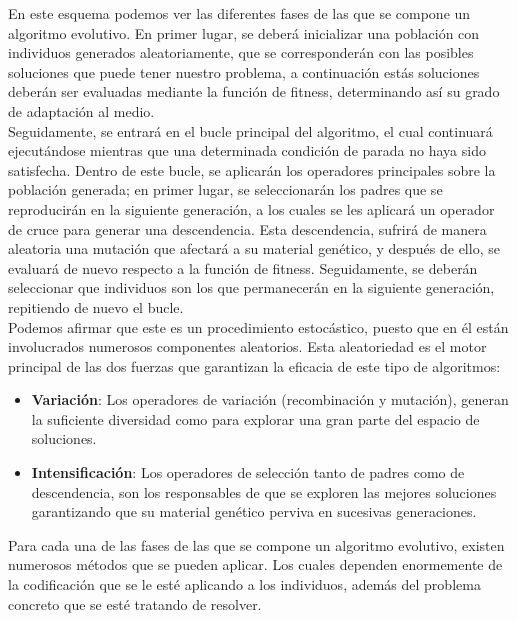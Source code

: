 En este esquema podemos ver las diferentes fases de las que se compone un algoritmo evolutivo. En primer lugar, se deberá inicializar una población con individuos generados aleatoriamente, que se corresponderán con las posibles soluciones que puede tener nuestro problema, a continuación estás soluciones deberán ser evaluadas mediante la función de fitness, determinando así su grado de adaptación al medio. \\

Seguidamente, se entrará en el bucle principal del algoritmo, el cual continuará ejecutándose mientras que una determinada condición de parada no haya sido satisfecha. Dentro de este bucle, se aplicarán los operadores principales sobre la población generada; en primer lugar, se seleccionarán los padres que se reproducirán en la siguiente generación, a los cuales se les aplicará un operador de cruce para generar una descendencia. Esta descendencia, sufrirá de manera aleatoria una mutación que afectará a su material genético, y después de ello, se evaluará de nuevo respecto a la función de fitness. Seguidamente, se deberán seleccionar que individuos son los que permanecerán en la siguiente generación, repitiendo de nuevo el bucle. \\

Podemos afirmar que este es un procedimiento estocástico, puesto que en él están involucrados numerosos componentes aleatorios. Esta aleatoriedad es el motor principal de las dos fuerzas que garantizan la eficacia de este tipo de algoritmos:

\begin{itemize}
    \item \textbf{Variación}: Los operadores de variación (recombinación y mutación), generan la suficiente diversidad como para explorar una gran parte del espacio de soluciones.
    \item \textbf{Intensificación}: Los operadores de selección tanto de padres como de descendencia, son los responsables de que se exploren las mejores soluciones garantizando que su material genético perviva en sucesivas generaciones.
\end{itemize}

Para cada una de las fases de las que se compone un algoritmo evolutivo, existen numerosos métodos que se pueden aplicar. Los cuales dependen enormemente de la codificación que se le esté aplicando a los individuos, además del problema concreto que se esté tratando de resolver.